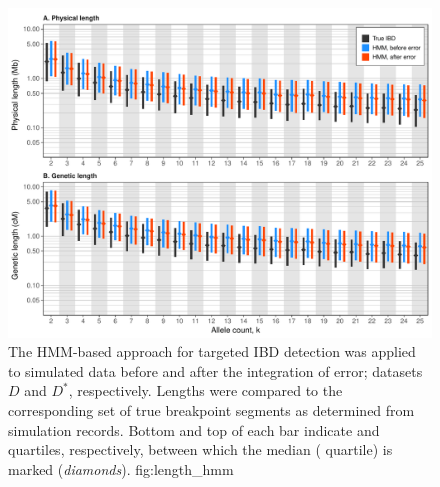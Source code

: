 

\begin{figure}[!htb]
\includegraphics[width=\textwidth]{./img/ch4/length_hmm}
{The HMM-based approach for targeted IBD detection was applied to simulated data before and after the integration of error; \ie datasets $D$ and $D^\ast$, respectively.
Lengths were compared to the corresponding set of true breakpoint segments as determined from simulation records.
Bottom and top of each bar indicate  and  quartiles, respectively, between which the median ( quartile) is marked (\emph{diamonds}).}
{fig:length_hmm}
\end{figure}
